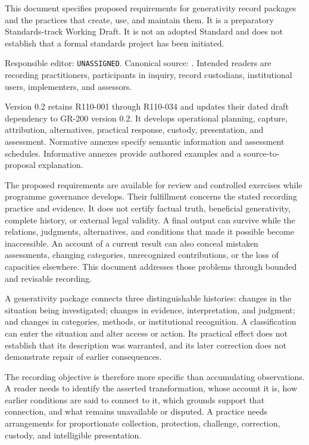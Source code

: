 \documentclass[11pt,a4paper]{article}
\begin{document}
\GSPfrontmatter
{}
This document specifies proposed requirements for generativity record packages and the practices that create, use, and maintain them. It is a preparatory Standards-track Working Draft. It is not an adopted Standard and does not establish that a formal standards project has been initiated.

Responsible editor: \texttt{UNASSIGNED}. Canonical source: . Intended readers are recording practitioners, participants in inquiry, record custodians, institutional users, implementers, and assessors.

Version 0.2 retains R110-001 through R110-034 and updates their dated draft dependency to GR-200 version 0.2. It develops operational planning, capture, attribution, alternatives, practical response, custody, presentation, and assessment. Normative annexes specify semantic information and assessment schedules. Informative annexes provide authored examples and a source-to-proposal explanation.

The proposed requirements are available for review and controlled exercises while programme governance develops. Their fulfillment concerns the stated recording practice and evidence. It does not certify factual truth, beneficial generativity, complete history, or external legal validity.
\tableofcontents
\clearpage
{}
A final output can survive while the relations, judgments, alternatives, and conditions that made it possible become inaccessible. An account of a current result can also conceal mistaken assessments, changing categories, unrecognized contributions, or the loss of capacities elsewhere. This document addresses those problems through bounded and revisable recording.

A generativity package connects three distinguishable histories: changes in the situation being investigated; changes in evidence, interpretation, and judgment; and changes in categories, methods, or institutional recognition. A classification can enter the situation and alter access or action. Its practical effect does not establish that its description was warranted, and its later correction does not demonstrate repair of earlier consequences.

The recording objective is therefore more specific than accumulating observations. A reader needs to identify the asserted transformation, whose account it is, how earlier conditions are said to connect to it, which grounds support that connection, and what remains unavailable or disputed. A practice needs arrangements for proportionate collection, protection, challenge, correction, custody, and intelligible presentation.
\end{document}
